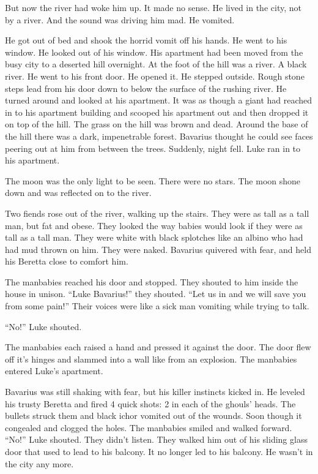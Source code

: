 But now the river had woke him up. It made no sense. He lived in
the city, not by a river. And the sound was driving him mad. He
vomited.

He got out of bed and shook the horrid vomit off his hands. He went
to his window. He looked out of his window. His apartment had been
moved from the busy city to a deserted hill overnight. At the foot
of the hill was a river. A black river. He went to his front door.
He opened it. He stepped outside. Rough stone steps lead from his
door down to below the surface of the rushing river. He turned
around and looked at his apartment. It was as though a giant had
reached in to his apartment building and scooped his apartment out
and then dropped it on top of the hill. The grass on the hill was
brown and dead. Around the base of the hill there was a dark,
impenetrable forest. Bavarius thought he could see faces peering
out at him from between the trees. Suddenly, night fell. Luke ran
in to his apartment.

The moon was the only light to be seen. There were no stars. The
moon shone down and was reflected on to the river.

Two fiends rose out of the river, walking up the stairs. They were
as tall as a tall man, but fat and obese. They looked the way
babies would look if they were as tall as a tall man. They were
white with black splotches like an albino who had had mud thrown on
him. They were naked. Bavarius quivered with fear, and held his
Beretta close to comfort him.

The manbabies reached his door and stopped. They shouted to him
inside the house in unison. ``Luke Bavarius!'' they shouted. ``Let us
in and we will save you from some pain!'' Their voices were like a
sick man vomiting while trying to talk.

``No!'' Luke shouted.

The manbabies each raised a hand and pressed it against the door.
The door flew off it's hinges and slammed into a wall like from an
explosion. The manbabies entered Luke's apartment.

Bavarius was still shaking with fear, but his killer instincts
kicked in. He leveled his trusty Beretta and fired 4 quick shots: 2
in each of the ghouls' heads. The bullets struck them and black
ichor vomited out of the wounds. Soon though it congealed and
clogged the holes. The manbabies smiled and walked forward. ``No!''
Luke shouted. They didn't listen. They walked him out of his
sliding glass door that used to lead to his balcony. It no longer
led to his balcony. He wasn't in the city any more.

